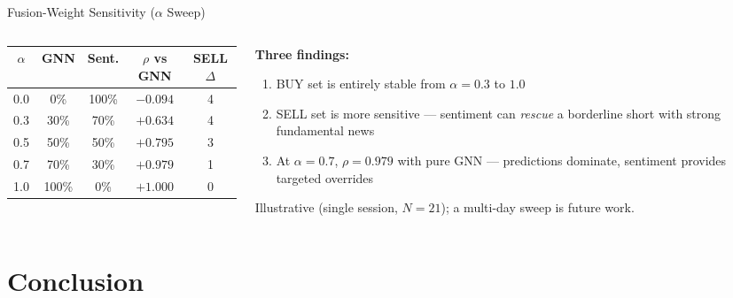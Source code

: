 \documentclass[aspectratio=169, 10pt]{beamer}
\begin{document}
\begin{frame}{Fusion-Weight Sensitivity ($\alpha$ Sweep)}
  \begin{columns}[T]
    \begin{column}{0.55\textwidth}
      \centering
      \renewcommand{\arraystretch}{1.25}
      \footnotesize
      \begin{tabular}{ccccc}
        \toprule
        $\alpha$ & GNN & Sent. & $\rho$ vs GNN & SELL $\Delta$ \\
        \midrule
        0.0 & 0\%   & 100\% & $-0.094$ & 4 \\
        0.3 & 30\%  & 70\%  & $+0.634$ & 4 \\
        0.5 & 50\%  & 50\%  & $+0.795$ & 3 \\
        0.7 & 70\%  & 30\%  & $+0.979$ & 1 \\
        1.0 & 100\% & 0\%   & $+1.000$ & 0 \\
        \bottomrule
      \end{tabular}
    \end{column}
    \begin{column}{0.43\textwidth}
      \footnotesize
      \textbf{Three findings:}
      \begin{enumerate}\setlength{\itemsep}{4pt}
        \item BUY set is \alert{entirely stable} from $\alpha{=}0.3$ to $1.0$
        \item SELL set is more sensitive — sentiment can \emph{rescue} a
              borderline short with strong fundamental news
        \item At $\alpha{=}0.7$, $\rho{=}0.979$ with pure GNN — predictions
              dominate, sentiment provides \alert{targeted overrides}
      \end{enumerate}
      \smallskip
      Illustrative (single session, $N{=}21$); a multi-day sweep is future work.
    \end{column}
  \end{columns}
\end{frame}

\section{Conclusion}
\end{document}
